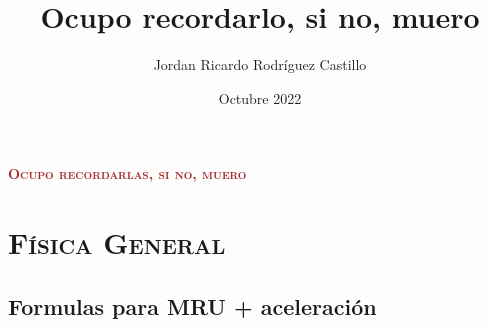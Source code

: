 \documentclass[letterpaper, 12pt]{article}
\title{Ocupo recordarlo, si no, muero}
\author{Jordan Ricardo Rodríguez Castillo}
\date{Octubre 2022}
\begin{document}
\pagecolor{fondo}


{
{\huge{
\textsc{
    \textbf{
        \textcolor{brown}{Ocupo recordarlas, si no, muero}}}
}}}

\pagestyle{fancy}
            \fancyhf{}
            \cfoot{\thepage}
                 
\section*{\textsc{Física General}}


    \subsection*{Formulas para MRU + aceleración}
    
\end{document}
